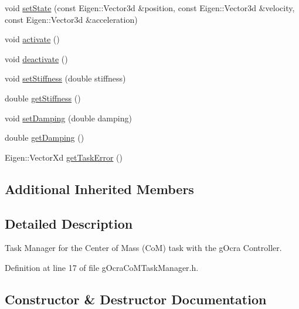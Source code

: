 \begin{DoxyCompactItemize}
\item 
void \hyperlink{classgocra_1_1gOcraCoMTaskManager_a652fe54cce0b1e88aba3ed0b07da1bc4}{set\+State} (const Eigen\+::\+Vector3d \&position, const Eigen\+::\+Vector3d \&velocity, const Eigen\+::\+Vector3d \&acceleration)
\item 
void \hyperlink{classgocra_1_1gOcraCoMTaskManager_a0a2649bf8ce377a8af44e13a3571f670}{activate} ()
\item 
void \hyperlink{classgocra_1_1gOcraCoMTaskManager_aec4b5fefd71eabb7ec71d0801a5bbf5f}{deactivate} ()
\item 
void \hyperlink{classgocra_1_1gOcraCoMTaskManager_a27aec28ef1c0f7cc3e49e431c87ffe70}{set\+Stiffness} (double stiffness)
\item 
double \hyperlink{classgocra_1_1gOcraCoMTaskManager_afc838311dae748d89ef76749192b2153}{get\+Stiffness} ()
\item 
void \hyperlink{classgocra_1_1gOcraCoMTaskManager_afe1e6ca547d469d3b504fccad7a9567d}{set\+Damping} (double damping)
\item 
double \hyperlink{classgocra_1_1gOcraCoMTaskManager_a9df173026478a08d1afa64f32fab2c01}{get\+Damping} ()
\item 
Eigen\+::\+Vector\+Xd \hyperlink{classgocra_1_1gOcraCoMTaskManager_a48cd88dc2fa3db834d3d4a17d39a8c30}{get\+Task\+Error} ()
\end{DoxyCompactItemize}
\subsection*{Additional Inherited Members}


\subsection{Detailed Description}
Task Manager for the Center of Mass (CoM) task with the g\+Ocra Controller. 



Definition at line 17 of file g\+Ocra\+Co\+M\+Task\+Manager.\+h.



\subsection{Constructor \& Destructor Documentation}
\hypertarget{classgocra_1_1gOcraCoMTaskManager_a7e9edb0004e6c63e689fcc3f260bdf96}{}\label{classgocra_1_1gOcraCoMTaskManager_a7e9edb0004e6c63e689fcc3f260bdf96} 
